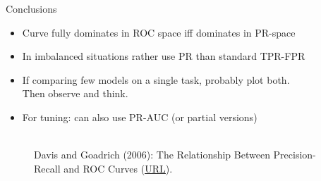 \documentclass[11pt,compress,t,notes=noshow, xcolor=table]{beamer}
\begin{document}
\begin{vbframe}{Conclusions}

\begin{itemize}
 \item Curve fully dominates in ROC space iff dominates in PR-space
 \item In imbalanced situations rather use PR than standard TPR-FPR
 \item If comparing few models on a single task, probably plot both.\\
 Then observe and think.
\item For tuning: can also use PR-AUC (or partial versions)
\end{itemize}

\vfill

\begin{figure}
  \centering
  \tiny
  \\Davis and Goadrich (2006): The Relationship Between Precision-Recall and
  ROC Curves (\href{https://www.biostat.wisc.edu/~page/rocpr.pdf}
  {\underline{URL}}).
\end{figure}
\end{vbframe}

\endlecture
\end{document}
